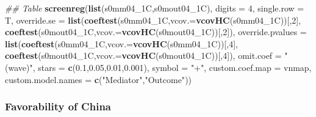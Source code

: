 \documentclass[
]{article}
\newenvironment{Shaded}{\begin{snugshade}}{\end{snugshade}}
\newcommand{\CommentTok}[1]{\textcolor[rgb]{0.56,0.35,0.01}{\textit{#1}}}
\newcommand{\DataTypeTok}[1]{\textcolor[rgb]{0.13,0.29,0.53}{#1}}
\newcommand{\DecValTok}[1]{\textcolor[rgb]{0.00,0.00,0.81}{#1}}
\newcommand{\FloatTok}[1]{\textcolor[rgb]{0.00,0.00,0.81}{#1}}
\newcommand{\KeywordTok}[1]{\textcolor[rgb]{0.13,0.29,0.53}{\textbf{#1}}}
\newcommand{\NormalTok}[1]{#1}
\newcommand{\StringTok}[1]{\textcolor[rgb]{0.31,0.60,0.02}{#1}}
\begin{document}
\begin{Shaded}
\begin{Highlighting}[]
\CommentTok{## Table}
\KeywordTok{screenreg}\NormalTok{(}\KeywordTok{list}\NormalTok{(s0mm04_1C,s0mout04_1C), }\DataTypeTok{digits =} \DecValTok{4}\NormalTok{, }\DataTypeTok{single.row =}\NormalTok{ T,}
          \DataTypeTok{override.se =} \KeywordTok{list}\NormalTok{(}\KeywordTok{coeftest}\NormalTok{(s0mm04_1C,}\DataTypeTok{vcov.=}\KeywordTok{vcovHC}\NormalTok{(s0mm04_1C))[,}\DecValTok{2}\NormalTok{],}
                             \KeywordTok{coeftest}\NormalTok{(s0mout04_1C,}\DataTypeTok{vcov.=}\KeywordTok{vcovHC}\NormalTok{(s0mout04_1C))[,}\DecValTok{2}\NormalTok{]),}
          \DataTypeTok{override.pvalues =} \KeywordTok{list}\NormalTok{(}\KeywordTok{coeftest}\NormalTok{(s0mm04_1C,}\DataTypeTok{vcov.=}\KeywordTok{vcovHC}\NormalTok{(s0mm04_1C))[,}\DecValTok{4}\NormalTok{],}
                                  \KeywordTok{coeftest}\NormalTok{(s0mout04_1C,}\DataTypeTok{vcov.=}\KeywordTok{vcovHC}\NormalTok{(s0mout04_1C))[,}\DecValTok{4}\NormalTok{]),}
          \DataTypeTok{omit.coef =} \StringTok{"(wave)"}\NormalTok{, }\DataTypeTok{stars =} \KeywordTok{c}\NormalTok{(}\FloatTok{0.1}\NormalTok{,}\FloatTok{0.05}\NormalTok{,}\FloatTok{0.01}\NormalTok{,}\FloatTok{0.001}\NormalTok{), }\DataTypeTok{symbol =} \StringTok{"+"}\NormalTok{,}
          \DataTypeTok{custom.coef.map =}\NormalTok{ vnmap, }
          \DataTypeTok{custom.model.names =} \KeywordTok{c}\NormalTok{(}\StringTok{"Mediator"}\NormalTok{,}\StringTok{"Outcome"}\NormalTok{))}
\end{Highlighting}
\end{Shaded}

\hypertarget{favorability-of-china}{%
\subsubsection{Favorability of China}\label{favorability-of-china}}
\end{document}
